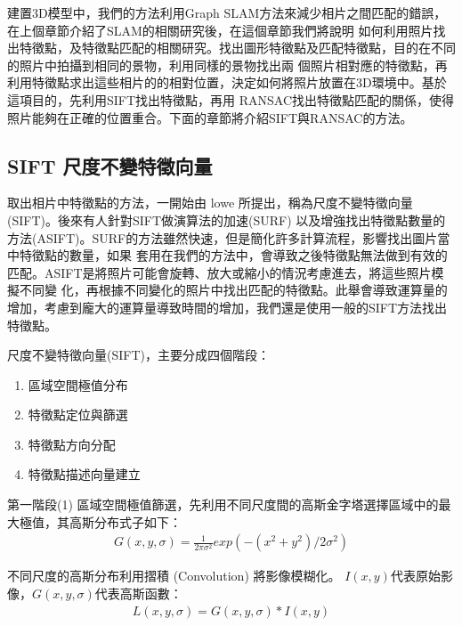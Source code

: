 	建置3D模型中，我們的方法利用Graph SLAM方法來減少相片之間匹配的錯誤，在上個章節介紹了SLAM的相關研究後，在這個章節我們將說明
如何利用照片找出特徵點，及特徵點匹配的相關研究。找出圖形特徵點及匹配特徵點，目的在不同的照片中拍攝到相同的景物，利用同樣的景物找出兩
個照片相對應的特徵點，再利用特徵點求出這些相片的的相對位置，決定如何將照片放置在3D環境中。基於這項目的，先利用SIFT找出特徵點，再用
RANSAC找出特徵點匹配的關係，使得照片能夠在正確的位置重合。下面的章節將介紹SIFT與RANSAC的方法。

	
\subsection{SIFT 尺度不變特徵向量}
	取出相片中特徵點的方法，一開始由 lowe \cite{Lowe2004} 所提出，稱為尺度不變特徵向量(SIFT)。後來有人針對SIFT做演算法的加速(SURF)\cite{Bay2006}
以及增強找出特徵點數量的方法(ASIFT)\cite{Guo2009}。SURF的方法雖然快速，但是簡化許多計算流程，影響找出圖片當中特徵點的數量，如果
套用在我們的方法中，會導致之後特徵點無法做到有效的匹配。ASIFT是將照片可能會旋轉、放大或縮小的情況考慮進去，將這些照片模擬不同變
化，再根據不同變化的照片中找出匹配的特徵點。此舉會導致運算量的增加，考慮到龐大的運算量導致時間的增加，我們還是使用一般的SIFT方法找出特徵點。


	尺度不變特徵向量(SIFT)，主要分成四個階段：

 \begin{enumerate}
	  \item 區域空間極值分布	
	  \item 特徵點定位與篩選
	  \item 特徵點方向分配
	  \item 特徵點描述向量建立
 \end{enumerate}

   第一階段(1) 區域空間極值篩選，先利用不同尺度間的高斯金字塔選擇區域中的最大極值，其高斯分布式子如下：
\begin{align}
  G(x,y,\sigma) = \frac{1}{2\pi\sigma^2}exp(-(x^2+y^2)/2\sigma^2) 
\end{align}

	不同尺度的高斯分布利用摺積 (Convolution) 將影像模糊化。 $I(x,y)$代表原始影像，$G(x,y,\sigma)$代表高斯函數：	
\begin{align}
  L(x,y,\sigma) = G(x,y,\sigma)\ast{I(x,y)}
\end{align}

